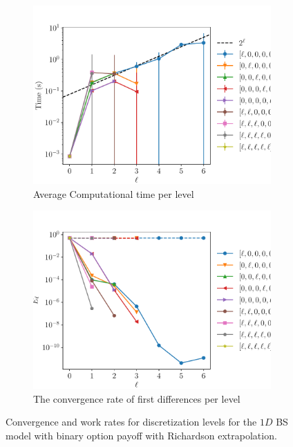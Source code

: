 \documentclass[11pt]{article}
\begin{document}
\begin{figure}[!h]
	\centering
	\begin{subfigure}{.5\textwidth}
		\centering
		\includegraphics[width=0.95\linewidth]{./figures/binary_4_8_steps/level_work.pdf}
		\caption{Average Computational time per level}
		\label{fig:misc_binary_4_8_steps_sub3}
	\end{subfigure}%
	\begin{subfigure}{.5\textwidth}
		\centering
		\includegraphics[width=0.95\linewidth]{./figures/binary_4_8_steps/levels_error_rate.pdf}
		\caption{ The convergence rate of first differences per level}
		\label{fig:misc_binary_4_8_steps_sub4}
	\end{subfigure}%
	\caption{Convergence and work rates for discretization levels for the $1D$ BS model with binary option payoff with Richardson extrapolation.}
	\label{fig:misc_binary_4_8_steps_2}
\end{figure}
\newpage
\end{document}
